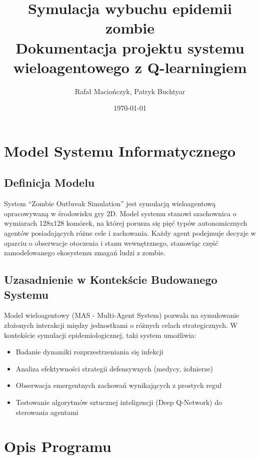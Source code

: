 \documentclass[12pt,a4paper]{article}
\begin{document}
\title{Symulacja wybuchu epidemii zombie\\\small{Dokumentacja projektu systemu wieloagentowego z Q-learningiem}}
\author{Rafał Maciończyk, Patryk Buchtyar}
\date{\today}

\maketitle
\tableofcontents
\newpage

\section{Model Systemu Informatycznego}

\subsection{Definicja Modelu}
System ``Zombie Outbreak Simulation'' jest symulacją wieloagentową opracowywaną
w środowisku gry 2D. Model systemu stanowi szachownica o wymiarach 128x128
komórek, na której porusza się pięć typów autonomicznych agentów posiadających
różne cele i zachowania. Każdy agent podejmuje decyzje w oparciu o obserwacje
otoczenia i stanu wewnętrznego, stanowiąc część zamodelowanego ekosystemu
zmagań ludzi z zombie.

\subsection{Uzasadnienie w Kontekście Budowanego Systemu}
Model wieloagentowy (MAS - Multi-Agent System) pozwala na symulowanie złożonych
interakcji między jednostkami o różnych celach strategicznych. W kontekście
symulacji epidemiologicznej, taki system umożliwia:
\begin{itemize}
	\item Badanie dynamiki rozprzestrzeniania się infekcji
	\item Analiza efektywności strategii defensywnych (medycy, żołnierze)
	\item Obserwacja emergentnych zachowań wynikających z prostych reguł
	\item Testowanie algorytmów sztucznej inteligencji (Deep Q-Network) do sterowania
	      agentami
\end{itemize}

\section{Opis Programu}
\end{document}

